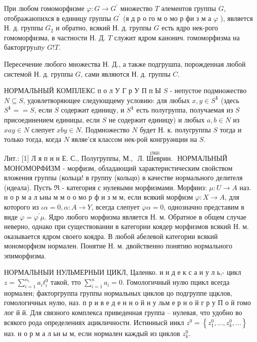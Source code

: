 \documentclass[10pt]{article}
\begin{document}
При любом гомоморфизме $\varphi: G \rightarrow G^{\prime}$ множество $T$ әлементов группы $G$, отображаюпихся в единицу группы $G^{\prime}$ (я д р о го м о мо р фи з м а $\varphi$ ), является Н. д. группы $G_{2}$ и обратно, всякий Н. д. группы $G$ есть ядро нек-рого гомоморфизма, в частности Н. Д. $T$ служит ядром канонич. гомоморфизма на бакторгруnпy $G ! T$.



Пересечение любого множества Н. Д., а также подгрушпа, порожденная любой системой Н. д. группы $G$, сами являются Н. д. группы $C$.



НОРМАЛЬНЫЙ КОМПЛЕКС п о л У Г р У П п Ы $S$ - непустое подмножество $N \subseteq S$, удовлетворяющее следующцему условию: для любых $x, y \in S^{\mathbf{1}}$ (здесь $S^{\mathbf{1}}==S$, если $S$ содержит единицу, и $S^{\mathbf{1}}$ есть полугруппа, получаемая из $S$ присоединением единицы, если $S$ не содержит единицу) и любых $a, b \in N$ из $x a y \in N$ слепует $x b y \in N$. Подмножество $N$ будет Н. к. полугруппы $S$ тогда и только тогда, когда $N$ являе'ся классом нек-рой конгруәнции на $S$.



Лит.: [1] Л я п и н Е. С., Полугруппы, М., $\stackrel{1960 .}{\text { Л. Шеврин. }}$ НОРМАЛЬНЫЙ МОНОМОРФИЗМ - морфизм, обладающий характеристическим свойством вложения группы (кольца! в группу (кольцо) в качестве нормального делителя (идеала). Пусть $\mathfrak{R}$ - категория с нулевыми морфизмами. Морфииз: $\mu: U \rightarrow A$ наз. н о р м а л ьны м м о о мо р ф и з м м, если всякий морфизм $\varphi: X \rightarrow A$, для которого из $\iota \alpha=0, \alpha: A \rightarrow Y$, всегда слепует $\varphi \alpha=0$, однозначно представим в виде $\varphi=\varphi^{\prime} \mu$. Ядро любого морфизма является Н. м. Обратное в общем случае неверно, однако при существовании в категории коядер морфизмов всякий Н. м. оказывается ядром своего коядра. В любой абелевой категории всякий мономорфизм нормален. Понятие Н. м. двойственно понятию нормального эпиморфизма.



НОРМАЛЬНЫИ НУЛЬМЕРНЫИ ЦИКЛ, Цаленко. и н д е к с а н у л ь,- цикл $z=\sum_{i=1}^{n_{i}} a_{i} t_{i}^{0}$ такой, тто $\sum_{i=1}^{n} a_{i}=0$. Гомологичный нулю пцикл всегда нормален; факторгруппа группы нормальных циклов цо подгруппе ццклов, гомологичных нулю, наз. п р и в е д е н н о й н у льм е р н о й г р у П о й гомо лог й й. Для связного комплекса приведенная группа -- нулевая, что удобно во всякого рода определениях ацикличности. Истиниысй иикл $z^{0}=\left\{z_{1}^{0}, \ldots, z_{k}^{0}, \ldots\right\}$ наз. н о р м а л ьн ы м, если нормален каждый из циклов $z_{k}^{0}$.
\end{document}
